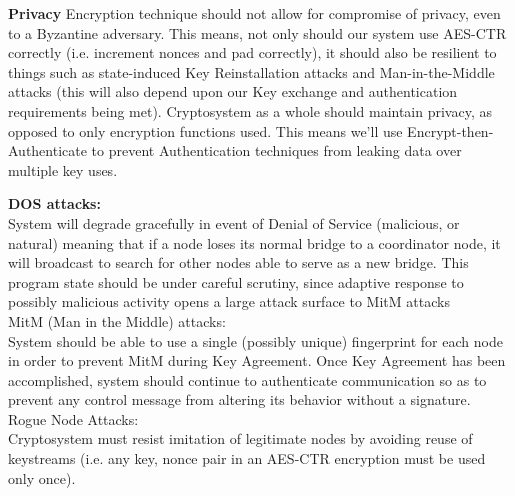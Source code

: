 \documentclass[tikz,a4paper,titlepage]{article}
\begin{document}
\textbf{Privacy}
Encryption technique should not allow for compromise of privacy, even to a Byzantine adversary. This means, not only should our system use AES-CTR correctly (i.e. increment nonces and pad correctly), it should also be resilient to things such as state-induced Key Reinstallation attacks and Man-in-the-Middle attacks (this will also depend upon our Key exchange and authentication requirements being met). Cryptosystem as a whole should maintain privacy, as opposed to only encryption functions used. This means we'll use Encrypt-then-Authenticate to prevent Authentication techniques from leaking data over multiple key uses.
    

{\bfseries{DOS attacks:}}\\
System will degrade gracefully in event of Denial of Service (malicious, or natural) meaning that if a node loses its normal bridge to a coordinator node, it will broadcast to search for other nodes able to serve as a new bridge. This program state should be under careful scrutiny, since adaptive response to possibly malicious activity opens a large attack surface to MitM attacks \\%

MitM (Man in the Middle) attacks:\\
System should be able to use a single (possibly unique) fingerprint for each node in order to prevent MitM during Key Agreement. Once Key Agreement has been accomplished, system should continue to authenticate communication so as to prevent any control message from altering its behavior without a signature.\\


Rogue Node Attacks:\\
Cryptosystem must resist imitation of legitimate nodes by avoiding reuse of keystreams (i.e. any key, nonce pair in an AES-CTR encryption must be used only once). \\
    
\end{document}
